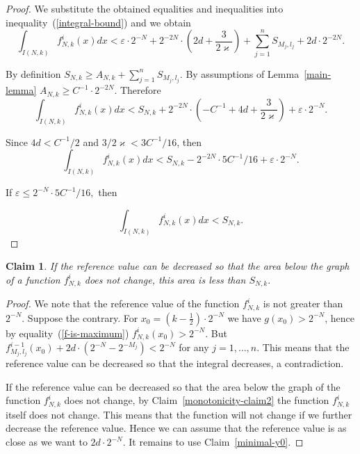 \documentclass[12pt]{article}
\newtheorem{clai}[prop]{Claim}
\theoremstyle{definition}
\begin{document}
\begin{proof}
We substitute the obtained equalities and inequalities into inequality~(\ref{integral-bound}) and we obtain
$$
\int_{I(N,k)}f_{N,k}^i(x)dx <\varepsilon\cdot2^{-N} + 2^{-2N}\cdot\left(2d + \frac3{2\varkappa}\right) + \sum\limits_{j=1}^n S_{M_j, l_j} + 2d\cdot2^{-2N}.
$$

By definition $S_{N,k}\ge A_{N,k} + \sum\limits_{j=1}^n S_{M_j, l_j}.$ By assumptions of Lemma~\ref{main-lemma} $A_{N,k}\ge C^{-1}\cdot2^{-2N}.$ Therefore
$$
\int_{I(N,k)}f_{N,k}^i(x)dx < S_{N,k} + 2^{-2N}\cdot\left(-C^{-1} + 4d + \frac3{2\varkappa}\right) + \varepsilon\cdot2^{-N}.
$$

Since $4d < C^{-1}/2$ and $3/2\varkappa < 3C^{-1}/16$, then
$$
\int_{I(N,k)}f_{N,k}^i(x)dx < S_{N,k} - 2^{-2N}\cdot 5C^{-1}/16 + \varepsilon\cdot 2^{-N}.
$$

If $\varepsilon \le 2^{-N}\cdot 5C^{-1}/16,$ then

$$
\int_{I(N,k)}f_{N,k}^i(x)dx < S_{N,k}.
$$
\end{proof}

\begin{clai}
\label{minimal-y0-2}
If the reference value can be decreased so that the area below the graph of a function $f_{N,k}^i$ does not change, this area is less than $S_{N,k}.$
\end{clai}

\begin{proof}
We note that the reference value of the function $f_{N,k}^i$ is not greater than $2^{-N}.$ Suppose the contrary. For $x_0 = \left(k-\frac12\right)\cdot2^{-N}$ we have $g(x_0)>2^{-N}$, hence by equality~(\ref{f-is-maximum}) $f_{N,k}^i(x_0)>2^{-N}.$ But $f_{M_j,l_j}^{i-1}(x_0) + 2d\cdot(2^{-N}-2^{-M_j}) < 2^{-N}$ for any $j=1,\dots,n.$ This means that the reference value can be decreased so that the integral decreases, a contradiction.

If the reference value can be decreased so that the area below the graph of the function $f_{N,k}^i$ does not change, by Claim~\ref{monotonicity-claim2} the function $f_{N,k}^i$ itself does not change. 
This means that the function will not change if we further decrease the reference value. Hence we can assume that the reference value is as close as we want to $2d\cdot2^{-N}$.
It remains to use Claim~\ref{minimal-y0}.
\end{proof}
\end{document}
